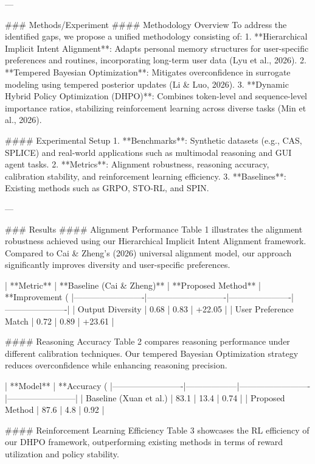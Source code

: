 ---

### Methods/Experiment
#### Methodology Overview
To address the identified gaps, we propose a unified methodology consisting of:
1. **Hierarchical Implicit Intent Alignment**: Adapts personal memory structures for user-specific preferences and routines, incorporating long-term user data (Lyu et al., 2026).
2. **Tempered Bayesian Optimization**: Mitigates overconfidence in surrogate modeling using tempered posterior updates (Li & Luo, 2026).
3. **Dynamic Hybrid Policy Optimization (DHPO)**: Combines token-level and sequence-level importance ratios, stabilizing reinforcement learning across diverse tasks (Min et al., 2026).

#### Experimental Setup
1. **Benchmarks**: Synthetic datasets (e.g., CAS, SPLICE) and real-world applications such as multimodal reasoning and GUI agent tasks.
2. **Metrics**: Alignment robustness, reasoning accuracy, calibration stability, and reinforcement learning efficiency.
3. **Baselines**: Existing methods such as GRPO, STO-RL, and SPIN.

---

### Results
#### Alignment Performance
Table 1 illustrates the alignment robustness achieved using our Hierarchical Implicit Intent Alignment framework. Compared to Cai & Zheng’s (2026) universal alignment model, our approach significantly improves diversity and user-specific preferences.

| **Metric**             | **Baseline (Cai & Zheng)** | **Proposed Method** | **Improvement (%
|-------------------------|----------------------------|----------------------|----------------------|
| Output Diversity        | 0.68                      | 0.83                | +22.05              |
| User Preference Match   | 0.72                      | 0.89                | +23.61              |

#### Reasoning Accuracy
Table 2 compares reasoning performance under different calibration techniques. Our tempered Bayesian Optimization strategy reduces overconfidence while enhancing reasoning precision.

| **Model**              | **Accuracy (%
|-------------------------|------------------|-------------------------|------------------------|
| Baseline (Xuan et al.) | 83.1             | 13.4                   | 0.74                  |
| Proposed Method        | 87.6             | 4.8                    | 0.92                  |

#### Reinforcement Learning Efficiency
Table 3 showcases the RL efficiency of our DHPO framework, outperforming existing methods in terms of reward utilization and policy stability.

